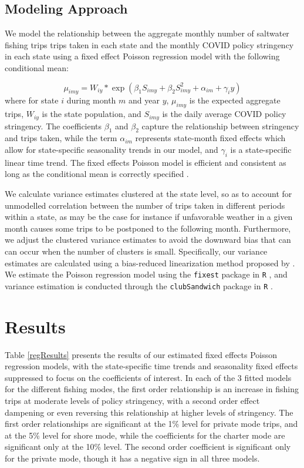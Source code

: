 \documentclass[12pt]{article}
\begin{document}
\subsection{Modeling Approach}

We model the relationship between the aggregate monthly number of
saltwater fishing trips trips taken in each state and the monthly COVID
policy stringency in each state using a fixed effect Poisson regression model with the
following conditional mean:

\[\mu_{imy} = W_{iy}*\exp(\beta_1 S_{imy} + \beta_2 S_{imy}^2 + \alpha_{im} + \gamma_i y)\]
where for state \(i\) during month \(m\) and year \(y\), \(\mu_{imy}\)
is the expected aggregate trips, \(W_{iy}\) is the state population, and
\(S_{imy}\) is the daily average COVID policy stringency. The
coefficients \(\beta_1\) and \(\beta_2\) capture the 
relationship between stringency and trips taken, while the term
\(\alpha_{im}\) represents state-month fixed effects which allow for
state-specific seasonality trends in our model, and \(\gamma_i\) is a
state-specific linear time trend. The fixed effects Poisson model is efficient and consistent as long as the conditional mean is correctly specified \citep{wooldridge2010econometric}.

We calculate variance estimates clustered at the state level, so as to
account for unmodelled correlation between the number of trips taken in
different periods within a state, as may be the case for instance if
unfavorable weather in a given month causes some trips to be postponed
to the following month. Furthermore, we adjust the clustered variance estimates
to avoid the downward bias that can can occur when the number of clusters is small. Specifically, our variance estimates are calculated
using a bias-reduced linearization method proposed by \citet{bell2002bias}. We estimate the Poisson regression model using the
\texttt{fixest} package in \texttt{R} \citep{berge2018Efficient}, and variance
estimation is conducted through the \texttt{clubSandwich} package in
\texttt{R}  \citep{pustejovsky2016Small}.

\section{Results}

Table \ref{regResults} presents the results of our estimated fixed
effects Poisson regression models, with the state-specific time trends
and seasonality fixed effects suppressed to focus on the coefficients of
interest. In each of the 3 fitted models for the different fishing
modes, the first order relationship is an increase in fishing trips at
moderate levels of policy stringency, with a second order effect
dampening or even reversing this relationship at higher levels of
stringency. The first order relationships are significant at the 1\%
level for private mode trips, and at the 5\% level for shore mode, while
the coefficients for the charter mode are significant only at the 10\%
level. The second order coefficient is significant only for the private
mode, though it has a negative sign in all three models.
\end{document}
